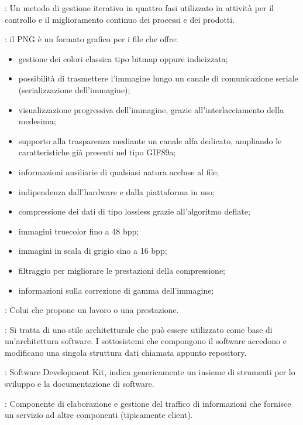 {		: Un metodo di gestione iterativo in quattro fasi utilizzato in attività per il controllo e il miglioramento continuo dei processi e dei prodotti.
		
		: il PNG è un formato grafico per i file che offre:
  			\begin{itemize}
    		\item gestione dei colori classica tipo bitmap oppure indicizzata;
    		\item possibilità di trasmettere l'immagine lungo un canale di comunicazione seriale (serializzazione dell'immagine);
   			\item visualizzazione progressiva dell'immagine, grazie all'interlacciamento della medesima;
    		\item supporto alla trasparenza mediante un canale alfa dedicato, ampliando le caratteristiche già presenti nel tipo GIF89a;
    		\item informazioni ausiliarie di qualsiasi natura accluse al file;
    		\item indipendenza dall'hardware e dalla piattaforma in uso;
    		\item compressione dei dati di tipo lossless grazie all'algoritmo deflate;
    		\item immagini truecolor fino a 48 bpp;
    		\item immagini in scala di grigio sino a 16 bpp;
    		\item filtraggio per migliorare le prestazioni della compressione;
    		\item informazioni sulla correzione di gamma dell'immagine;
  			\end{itemize}
			
		: Colui che propone un lavoro o una prestazione.	
		

		: Si tratta di uno stile architetturale che può essere utilizzato come base di un'architettura software. I sottosistemi che compongono il software accedono e modificano una singola struttura dati chiamata appunto repository.	
			
		 : Software Development Kit, indica genericamente un insieme di strumenti per lo sviluppo e la documentazione di software.		
		
		: Componente di elaborazione e gestione del traffico di informazioni che fornisce un servizio ad altre componenti (tipicamente client).
		
}
